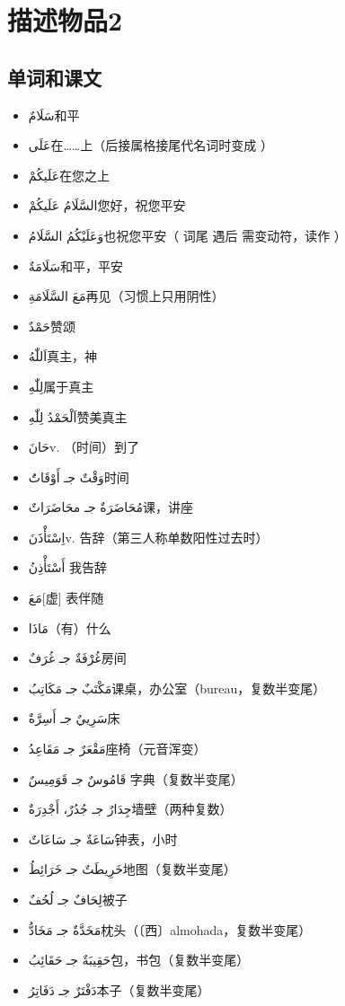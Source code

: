 \chapter{描述物品2}

\section{单词和课文}

\begin{itemize}
    \item \ac{سَلَامٌ}{和平}
    \item \ac{عَلَى}{在……上（后接属格接尾代名词时变成 ）}
    \item \ac{عَلَيكُمْ}{在您之上}
    \item \ac{السَّلَامُ عَلَيكُمْ}{您好，祝您平安}
    \item \ac{وَعَلَيْكُمُ السَّلَامُ}{也祝您平安（  词尾  遇后  需变动符，读作 ）}
    \item \ac{سَلَامَةٌ}{和平，平安}
    \item \ac{مَعَ السَّلَامَةِ}{再见（习惯上只用阴性）}
    \item \ac{حَمْدٌ}{赞颂}
    \item \ac{اَللّٰهُ}{真主，神}
    \item \ac{لِلّٰهِ}{属于真主}
    \item \ac{اَلْحَمْدُ لِلّٰهِ}{赞美真主}
    \item \ac{حَانَ}{v. （时间）到了}
    \item \ac{وَقْتٌ جـ أَوْقَاتَُ}{时间}
    \item \ac{مُحَاضَرَةٌ جـ محَاضَرَاتٌ}{课，讲座}
    \item \ac{اِسْتَأْذَنَ}{v. 告辞（第三人称单数阳性过去时）}
    \item \ac{أَسْتَأْذِنُ }{我告辞}
    \item \ac{مَعَ}{[虚] 表伴随}
    \item \ac{مَاذَا}{（有）什么}
    \item \ac{غُرْفَةٌ جـ غُرَفٌ}{房间}
    \item \ac{مَكْتَبٌ جـ مَكَاتِبُ}{课桌，办公室（bureau，复数半变尾）}
    \item \ac{سَرِييٌ جـ أَسِرَّةٌ}{床}
    \item \ac{مَقْعَرٌ جـ مَقَاعِدُ}{座椅（元音浑变）}
    \item \ac{قَامُوسٌ جـ قَوَمِيسٌ }{字典（复数半变尾）}
    \item \ac{جِدَارٌ جـ جُدُرٌ، أَجْدِرَةٌ}{墙壁（两种复数）}
    \item \ac{سَاعَةٌ جـ سَاعَاتٌ}{钟表，小时}
    \item \ac{خَرِيطَتٌ جـ خَرَائِطُ}{地图（复数半变尾）}
    \item \ac{لِحَافٌ جـ لُحُفٌ}{被子}
    \item \ac{مَخَدَّةٌ جـ مَخَادُّ}{枕头（〔西〕almohada，复数半变尾）}
    \item \ac{حَقِيبَةٌ جـ حَقَائِبُ}{包，书包（复数半变尾）}
    \item \ac{دَفْتَرٌ جـ دَفَاتِرُ}{本子（复数半变尾）} 
\end{itemize}

